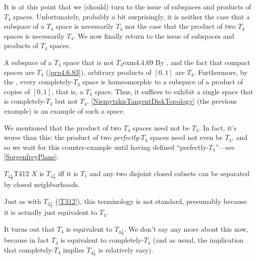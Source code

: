 It is at this point that we (should) turn to the issue of subspaces and products of $T_4$ spaces.  Unfortunately, probably a bit surprisingly, it is neither the case that a subspace of a $T_4$ space is necessarily $T_4$ nor the case that the product of two $T_4$ spaces is necessarily $T_4$.
We now finally return to the issue of subspaces and products of $T_4$ spaces.
\begin{exm}{A subspace of a $T_4$ space that is not $T_4$}{exm4.4.69}
By , and the fact that compact spaces are $T_4$ (\cref{prp4.6.83}), arbitrary products of $[0,1]$ are $T_4$.  Furthermore, by the , every completely-$T_3$ space is homeomorphic to a subspace of a product of copies of $[0,1]$, that is, a $T_4$ space.  Thus, it suffices to exhibit a single space that is completely-$T_3$ but not $T_4$.  \cref{NiemytzkisTangentDiskTopology} (the previous example) is an example of such a space.
\end{exm}
We mentioned that the product of two $T_4$ spaces need not be $T_4$.  In fact, it's worse than this:  the product of two \emph{perfectly}-$T_4$ spaces need not even be $T_4$, and so we wait for this counter-example until having defined ``perfectly-$T_4$''---see \cref{SorgenfreyPlane}.

\begin{dfn}{$T_{4\frac{1}{2}}$}{T412}
$X$ is \emph{$T_{4\frac{1}{2}}$} iff it is $T_1$ and any two disjoint closed subsets can be separated by closed neighborhoods.
\begin{rmk}
Just as with $T_{3\frac{1}{2}}$ (\cref{T312}), this terminology is not standard, presumably because it is actually just equivalent to $T_4$.
\end{rmk}
\begin{rmk}
It turns out that $T_4$ is equivalent to $T_{4\frac{1}{2}}$.  We don't say any more about this now, because in fact $T_4$ is equivalent to completely-$T_4$ (and as usual, the implication that completely-$T_4$ implies $T_{4\frac{1}{2}}$ is relatively easy).
\end{rmk}
\end{dfn}

